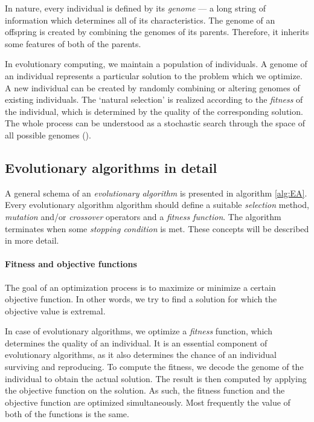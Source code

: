 In nature, every individual is defined by its \emph{genome} --- a long string
of information which determines all of its characteristics. The genome of an
offspring is created by combining the genomes of its parents. Therefore, it
inherits some features of both of the parents.

In evolutionary computing, we maintain a population of individuals. A
ge\-no\-me of an individual represents a particular solution to the problem
which we optimize. A new individual can be created by randomly combining or
altering genomes of existing individuals. The `natural selection' is realized
according to the \emph{fitness} of the individual, which is determined by the
quality of the corresponding solution. The whole process can be understood as
a stochastic search through the space of all possible genomes
(\cite{Engelbrecht:2007:CII:1557464}).

\subsection{Evolutionary algorithms in detail}
A general schema of an \emph{evolutionary algorithm} is presented in algorithm
\ref{alg:EA}. Every evolutionary algorithm
algorithm should define a suitable \emph{selection} method, \emph{mutation}
and/or \emph{crossover} operators and a \emph{fitness function}.
The algorithm terminates when some \emph{stopping condition} is met. These
concepts will be described in more detail.

\paragraph{Fitness and objective functions}
The goal of an optimization process is to maximize or minimize a certain
objective function. In other words, we try to find a solution for which the
objective value is extremal.

In case of evolutionary algorithms, we optimize a \emph{fitness} function,
which determines the quality of an individual. It is an essential component of
evolutionary algorithms, as it also determines the chance of an individual
surviving and reproducing. To compute the fitness, we decode the genome of
the individual to obtain the actual solution. The result is then computed by
applying the objective function on the solution. As such, the fitness function
and the objective function are optimized simultaneously. Most frequently the
value of both of the functions is the same.

